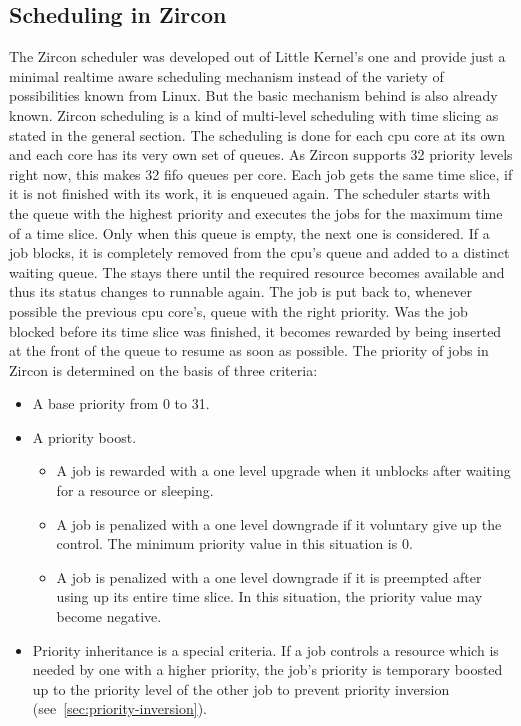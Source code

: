 \subsection{Scheduling in Zircon}
The Zircon scheduler was developed out of Little Kernel's one and provide just a minimal realtime aware scheduling mechanism instead of the variety of possibilities known from Linux.
But the basic mechanism behind is also already known.
Zircon scheduling is a kind of multi-level scheduling with time slicing as stated in the general section.
The scheduling is done for each \ac{cpu} core at its own and each core has its very own set of queues.
As Zircon supports 32 priority levels right now, this makes 32 \ac{fifo} queues per core\cite{zircon-scheduling}.
Each job gets the same time slice, if it is not finished with its work, it is enqueued again.
The scheduler starts with the queue with the highest priority and executes the jobs for the maximum time of a time slice.
Only when this queue is empty, the next one is considered.
If a job blocks, it is completely removed from the \ac{cpu}'s queue and added to a distinct waiting queue.
The stays there until the required resource becomes available and thus its status changes to runnable again.
The job is put back to, whenever possible the previous \ac{cpu} core's, queue with the right priority.
Was the job blocked before its time slice was finished, it becomes rewarded by being inserted at the front of the queue to resume as soon as possible\cite{zircon-scheduling}.
%
The priority of jobs in Zircon is determined on the basis of three criteria:
\begin{itemize}
    \item A base priority from 0 to 31.
    \item A priority boost. 
        \begin{itemize}
            \item A job is rewarded with a one level upgrade when it unblocks after waiting for a resource or sleeping. 
            \item A job is penalized with a one level downgrade if it voluntary give up the control. The minimum priority value in this situation is 0.
            \item A job is penalized with a one level downgrade if it is preempted after using up its entire time slice. In this situation, the priority value may become negative.
        \end{itemize}
    \item Priority inheritance is a special criteria. If a job controls a resource which is needed by one with a higher priority, the job's priority is temporary boosted up to the priority level of the other job to prevent priority inversion (see~\ref{sec:priority-inversion}). 
\end{itemize}
